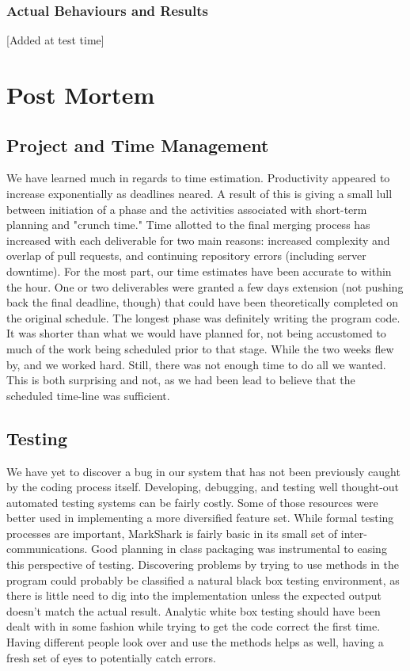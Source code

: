 \documentclass{article}
\begin{document}
\subsubsection{Actual Behaviours and Results}
[Added at test time]

\section{Post Mortem}
\subsection{Project and Time Management}
We have learned much in regards to time estimation.  Productivity appeared to increase exponentially as deadlines neared.  A result of this is giving a small lull between initiation of a phase and the activities associated with short-term planning and "crunch time."  Time allotted to the final merging process has increased with each deliverable for two main reasons: increased complexity and overlap of pull requests, and continuing repository errors (including server downtime).
For the most part, our time estimates have been accurate to within the hour.  One or two deliverables were granted a few days extension (not pushing back the final deadline, though) that could have been theoretically completed on the original schedule.  The longest phase was definitely writing the program code.  It was shorter than what we would have planned for, not being accustomed to much of the work being scheduled prior to that stage.  While the two weeks flew by, and we worked hard. Still, there was not enough time to do all we wanted.  This is both surprising and not, as we had been lead to believe that the scheduled time-line was sufficient.

\subsection{Testing}
We have yet to discover a bug in our system that has not been previously caught by the coding process itself.  Developing, debugging, and testing well thought-out automated testing systems can be fairly costly.  Some of those resources were better used in implementing a more diversified feature set.  While formal testing processes are important, MarkShark is fairly basic in its small set of inter-communications.  Good planning in class packaging was instrumental to easing this perspective of testing.  Discovering problems by trying to use methods in the program could probably  be classified a natural black box testing environment, as there is little need to dig into the implementation unless the expected output doesn't match the actual result.  Analytic white box testing should have been dealt with in some fashion while trying to get the code correct the first time.  Having different people look over and use the methods helps as well, having a fresh set of eyes to potentially catch errors.  
\end{document}
